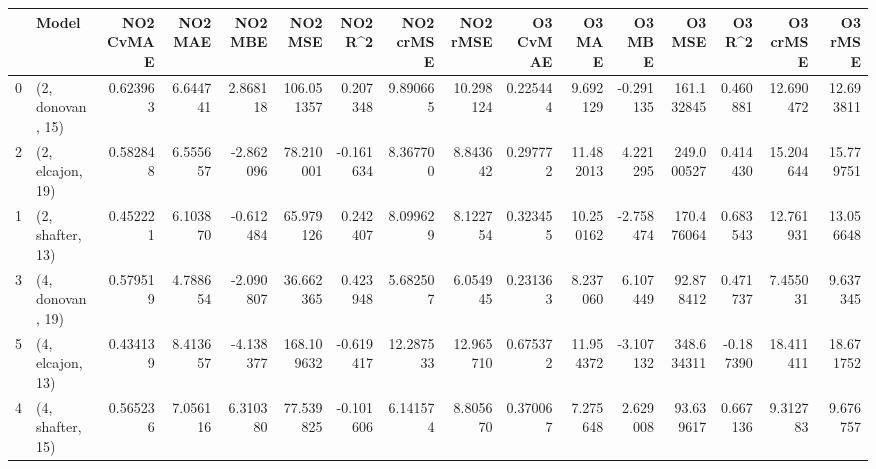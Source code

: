 \begin{tabular}{llrrrrrrrrrrrrrr}
\toprule
{} &             Model &  NO2 CvMAE &   NO2 MAE &   NO2 MBE &     NO2 MSE &   NO2 R\textasciicircum2 &  NO2 crMSE &   NO2 rMSE &  O3 CvMAE &     O3 MAE &    O3 MBE &      O3 MSE &    O3 R\textasciicircum2 &   O3 crMSE &    O3 rMSE \\
\midrule
0 &  (2, donovan, 15) &   0.623963 &  6.644741 &  2.868118 &  106.051357 &  0.207348 &   9.890665 &  10.298124 &  0.225444 &   9.692129 & -0.291135 &  161.132845 &  0.460881 &  12.690472 &  12.693811 \\
2 &  (2, elcajon, 19) &   0.582848 &  6.555657 & -2.862096 &   78.210001 & -0.161634 &   8.367700 &   8.843642 &  0.297772 &  11.482013 &  4.221295 &  249.000527 &  0.414430 &  15.204644 &  15.779751 \\
1 &  (2, shafter, 13) &   0.452221 &  6.103870 & -0.612484 &   65.979126 &  0.242407 &   8.099629 &   8.122754 &  0.323455 &  10.250162 & -2.758474 &  170.476064 &  0.683543 &  12.761931 &  13.056648 \\
3 &  (4, donovan, 19) &   0.579519 &  4.788654 & -2.090807 &   36.662365 &  0.423948 &   5.682507 &   6.054945 &  0.231363 &   8.237060 &  6.107449 &   92.878412 &  0.471737 &   7.455031 &   9.637345 \\
5 &  (4, elcajon, 13) &   0.434139 &  8.413657 & -4.138377 &  168.109632 & -0.619417 &  12.287533 &  12.965710 &  0.675372 &  11.954372 & -3.107132 &  348.634311 & -0.187390 &  18.411411 &  18.671752 \\
4 &  (4, shafter, 15) &   0.565236 &  7.056116 &  6.310380 &   77.539825 & -0.101606 &   6.141574 &   8.805670 &  0.370067 &   7.275648 &  2.629008 &   93.639617 &  0.667136 &   9.312783 &   9.676757 \\
\bottomrule
\end{tabular}
